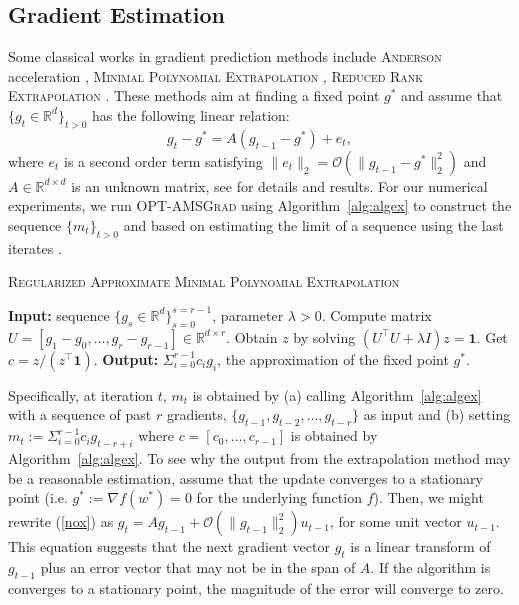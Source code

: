 \documentclass[11pt]{article}
\theoremstyle{k}
\begin{document}
\subsection{Gradient Estimation}
Some classical works in gradient prediction methods include \textsc{Anderson} acceleration \citep{WN11}, \textsc{Minimal Polynomial Extrapolation} \citep{CJ76},  \textsc{Reduced Rank Extrapolation} \citep{E79}.
These methods aim at finding a fixed point $g^{*}$ and assume that $\{g_t \in \mathbb R^d\}_{t>0} $ has the following linear relation:\vspace{-0.1cm}
\begin{equation} \label{nox}
g_t - g^* = A( g_{t-1} - g^* ) + e_t,
\end{equation}
where $e_t$ is a second order term satisfying $\| e_t \|_2  = \mathcal{O}( \| g_{t-1} - g^* \|_2^2)$ and $A \in \mathbb R^{d \times d}$ is an unknown matrix, see \citep{SAB16} for details and results.
For our numerical experiments, we run \textsc{OPT-AMSGrad} using Algorithm~\ref{alg:algex} to construct the sequence $\{m_t\}_{t>0}$ and based on estimating the limit of a sequence using the last iterates \citep{BZ13}.
\begin{algorithm}[h]
\begin{algorithmic}[1] 
\small
\caption{\textsc{Regularized Approximate Minimal Polynomial Extrapolation}
\citep{SAB16} } \label{alg:algex}
\STATE \textbf{Input:} sequence $\{ g_s \in \mathbb R^d \}_{s=0}^{s=r-1}$, parameter $\lambda > 0$.
\STATE Compute matrix  $U = [ g_1 - g_0, \dots, g_{r} - g_{r-1}] \in \mathbb R^{d \times r}$.
\STATE Obtain $z$ by solving $(U^\top U + \lambda I ) z = \mathbf{1}$.
\STATE Get $c= z / (z^\top \mathbf{1})$.
\STATE \textbf{Output:} $\Sigma_{i=0}^{r-1} c_i g_i$, the approximation of the fixed point $g^*$.
\end{algorithmic}
\end{algorithm}
Specifically, at iteration $t$, $m_t$ is obtained by \textsf{(a)} calling Algorithm~\ref{alg:algex} with a sequence of past $r$ gradients, $\{ g_{t-1},g_{t-2}, \dots, g_{t-r} \}$ as input and \textsf{(b)} setting $m_t:= \Sigma_{i=0}^{r-1} c_i g_{t-r+i}$ where $c = [c_0, \dots, c_{r-1}] $ is obtained by Algorithm~\ref{alg:algex}.
To see why the output from the extrapolation method may be a reasonable estimation, assume that the update converges to a stationary point (i.e. $g^*:=\nabla f(w^*) = 0$ for the underlying function $f$). Then, we might rewrite (\ref{nox}) as $g_t = A g_{t-1}  + \mathcal{O}( \| g_{t-1} \|_2^2 ) u_{t-1}$, for some unit vector $u_{t-1}$.
This equation suggests that the next gradient vector $g_{t}$ is a linear transform of $g_{{t-1}}$ plus an error vector that may not be in the span of $A$.
If the algorithm is converges to a stationary point, the magnitude of the error will converge to zero.
\end{document}
